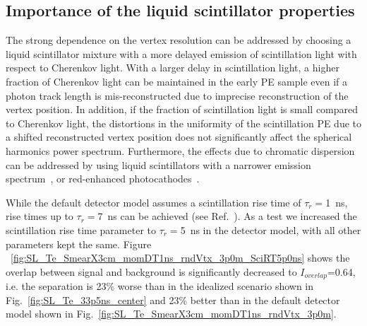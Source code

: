 

\subsection{Importance of the liquid scintillator properties}
The strong dependence on the vertex resolution can be addressed by
choosing a liquid scintillator mixture with a more delayed emission of
scintillation light with respect to Cherenkov light. With a larger
delay in scintillation light, a higher fraction of Cherenkov light can
be maintained in the early PE sample even if a photon track length is
mis-reconstructed due to imprecise reconstruction of the vertex
position. In addition, if the fraction of scintillation light is small
compared to Cherenkov light, the distortions in the uniformity of the
scintillation PE due to a shifted reconstructed vertex position does
not significantly affect the spherical harmonics power
spectrum. Furthermore, the effects due to chromatic dispersion can be
addressed by using liquid scintillators with a narrower emission
spectrum~\cite{Aberle2014}, or red-enhanced
photocathodes~\cite{Aberle2014}.



While the default detector model assumes a scintillation rise time of
$\tau_r=$1~ns, rise times up to $\tau_r=$7~ns can be achieved (see
Ref.~\cite{Minfang_slow_rise_time}). As a test we increased the
scintillation rise time parameter to $\tau_r=$5~ns in the detector
model, with all other parameters kept the same.  Figure
~\ref{fig:SL_Te_SmearX3cm_momDT1ns_rndVtx_3p0m_SciRT5p0ns} shows the
overlap between signal and background is significantly decreased to
$I_{overlap}$=0.64, i.e. the separation is 23\% worse than in the
idealized scenario shown in Fig.~\ref{fig:SL_Te_33p5ns_center} and
23\% better than in the default detector model shown in
Fig.~\ref{fig:SL_Te_SmearX3cm_momDT1ns_rndVtx_3p0m}.

